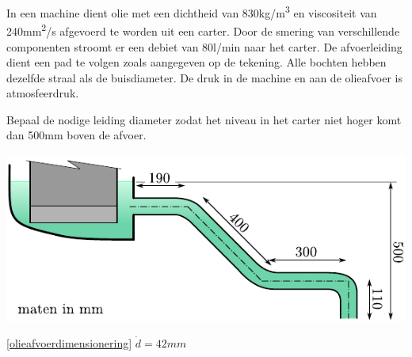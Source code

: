 \begin{toepassing}[*]
	\label{olieafvoerdimensionering}
In een machine dient olie met een dichtheid van 830\unit{kg/m^3} en viscositeit van 240\unit{mm^2/s} afgevoerd te worden uit een carter. Door de smering van verschillende componenten stroomt er een debiet van 80l/min naar het carter. De afvoerleiding dient een pad te volgen zoals aangegeven op de tekening. Alle bochten hebben dezelfde straal als de buisdiameter. De druk in de machine en aan de olieafvoer is atmosfeerdruk.
	
Bepaal de nodige leiding diameter zodat het niveau in het carter niet hoger komt dan 500mm boven de afvoer.

	\centering
	\includegraphics{fig/stroming_in_leidingen/olieafvoerdimensionering}
\end{toepassing}
\begin{antwoord}{\ref{olieafvoerdimensionering}}
	$\dot{d} = 42\unit{mm}$
\end{antwoord}
